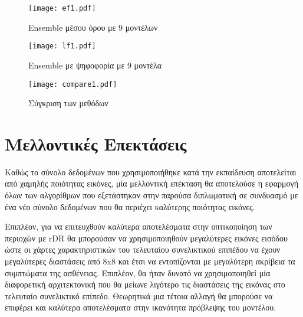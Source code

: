   
     



\begin{figure}[!h]
    \centering
      \texttt{[image: ef1.pdf]} \caption{Ensemble μέσου όρου με 9 μοντέλων}
      \label{figure:ef1}    
  \end{figure}

\begin{figure}[!h]
    \centering
      \texttt{[image: lf1.pdf]} \caption{Ensemble με ψηφοφορία με 9 μοντέλα}
      \label{figure:lf1}    
  \end{figure}


\begin{figure}[!h]
    \centering
      \texttt{[image: compare1.pdf]} \caption{Σύγκριση των μεθόδων}
      \label{figure:compare1}    
  \end{figure}





\section{Μελλοντικές Επεκτάσεις}
\label{sec:7.3}

Καθώς το σύνολο δεδομένων που χρησιμοποιήθηκε κατά την εκπαίδευση αποτελείται από χαμηλής ποιότητας εικόνες, μία μελλοντική επέκταση θα αποτελούσε η εφαρμογή όλων των αλγορίθμων που εξετάστηκαν στην παρούσα διπλωματική σε συνδυασμό με ένα νέο σύνολο δεδομένων που θα περιέχει καλύτερης ποιότητας εικόνες.

Επιπλέον, για να επιτευχθούν καλύτερα αποτελέσματα στην οπτικοποίηση των περιοχών με rDR θα μπορούσαν να χρησιμοποιηθούν μεγαλύτερες εικόνες εισόδου ώστε οι χάρτες χαρακτηριστικών του τελευταίου συνελικτικού επιπέδου να έχουν μεγαλύτερες διαστάσεις από 8x8 και έτσι να εντοπίζονται με μεγαλύτερη ακρίβεια τα συμπτώματα της ασθένειας. Επιπλέον, θα ήταν δυνατό να χρησιμοποιηθεί μία διαφορετική αρχιτεκτονική που θα μείωνε λιγότερο τις διαστάσεις της εικόνας στο τελευταίο συνελικτικό επίπεδο. Θεωρητικά μια τέτοια αλλαγή θα μπορούσε να επιφέρει και καλύτερα αποτελέσματα στην ικανότητα πρόβλεψης του μοντέλου.

